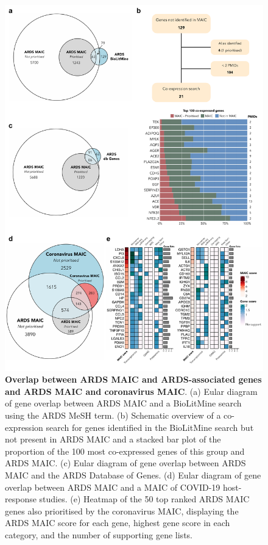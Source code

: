 \documentclass[
  11,
  a4paper,
]{article}
\begin{document}
\begin{figure}[H]

{\centering \includegraphics{../img/Supplementary_Figure_3.png}

}

\caption{\textbf{Overlap between ARDS MAIC and ARDS-associated genes and
ARDS MAIC and coronavirus MAIC}. (a) Eular diagram of gene overlap
between ARDS MAIC and a BioLitMine search using the ARDS MeSH term. (b)
Schematic overview of a co-expression search for genes identified in the
BioLitMine search but not present in ARDS MAIC and a stacked bar plot of
the proportion of the 100 most co-expressed genes of this group and ARDS
MAIC. (c) Eular diagram of gene overlap between ARDS MAIC and the ARDS
Database of Genes. (d) Eular diagram of gene overlap between ARDS MAIC
and a MAIC of COVID-19 host-response studies. (e) Heatmap of the 50 top
ranked ARDS MAIC genes also prioritised by the coronavirus MAIC,
displaying the ARDS MAIC score for each gene, highest gene score in each
category, and the number of supporting gene lists.}

\end{figure}%
\end{document}
